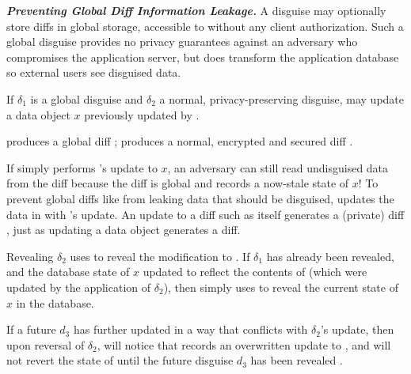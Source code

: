 \vspace{6pt}\noindent\textbf{\emph{Preventing Global Diff Information Leakage.}}
%
A disguise may optionally store diffs in global storage, accessible to \sys without any client
authorization.
Such a global disguise provides no privacy guarantees against an adversary who compromises 
the application server, but does transform the application database so external users see disguised
data.

If $\delta_1$ is a global disguise and $\delta_2$ a normal, privacy-preserving disguise,
 may update a data object $x$ previously updated by . 

 produces a global diff ;  produces a normal,
encrypted and secured diff .

If \sys simply performs 's update to $x$, an adversary can still read undisguised data
from the  diff because the diff is global and records a now-stale state of $x$!
%
To prevent global diffs like  from leaking data that should be disguised, \sys
updates the data in  with 's update. An update to a diff such as
 itself generates a (private) diff , just as updating a data
object generates a diff.

Revealing $\delta_2$ uses  to reveal the modification to . 
If $\delta_1$ has already been revealed, and the database state of $x$ updated to reflect the
contents of  (which were updated by the application of $\delta_2$), then \sys
simply uses  to reveal the current state of $x$ in the database. 

If a future $d_3$ has further updated  in a way that conflicts with $\delta_2$'s update, then
upon reversal of $\delta_2$, \sys will notice that  records an overwritten update to
, and will not revert the state of  until the future disguise $d_3$ has been
revealed .



